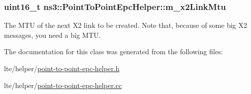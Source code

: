 \subsubsection[{\texorpdfstring{m\+\_\+x2\+Link\+Mtu}{m_x2LinkMtu}}]{\setlength{\rightskip}{0pt plus 5cm}uint16\+\_\+t ns3\+::\+Point\+To\+Point\+Epc\+Helper\+::m\+\_\+x2\+Link\+Mtu\hspace{0.3cm}{\ttfamily [private]}}\hypertarget{classns3_1_1PointToPointEpcHelper_af2fe6768a3a0a75321562f01d2abff2d}{}\label{classns3_1_1PointToPointEpcHelper_af2fe6768a3a0a75321562f01d2abff2d}
The M\+TU of the next X2 link to be created. Note that, because of some big X2 messages, you need a big M\+TU. 

The documentation for this class was generated from the following files\+:\begin{DoxyCompactItemize}
\item 
lte/helper/\hyperlink{point-to-point-epc-helper_8h}{point-\/to-\/point-\/epc-\/helper.\+h}\item 
lte/helper/\hyperlink{point-to-point-epc-helper_8cc}{point-\/to-\/point-\/epc-\/helper.\+cc}\end{DoxyCompactItemize}
